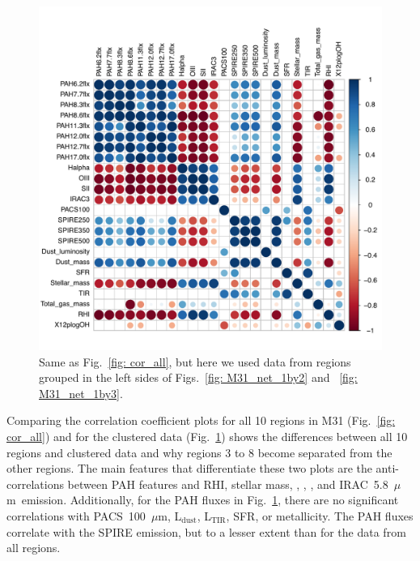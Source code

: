         \begin{figure}
        \includegraphics[width=\textwidth]{../image_paper3/images0.01/cor_plots/M31_derived_3_to_8_core_plot_for_paper.pdf}
        \caption[Pearson correlation coefficients for data from the clustered regions in M31]{Same as Fig.~\ref{fig: cor_all}, but here we used data from regions grouped in the left sides of Figs.~\ref{fig: M31_net_1by2} and ~\ref{fig: M31_net_1by3}.}
          \label{fig: cor_cluster1}
        \end{figure}
        
       
        Comparing the correlation coefficient plots for all 10 regions in M31 (Fig.~\ref{fig: cor_all}) and for the clustered data (Fig.~\ref{fig: cor_cluster1}) shows the differences between all 10 regions and clustered data and why regions 3 to 8 become separated from the other regions.
        The main features that differentiate these two plots are the anti-correlations between PAH features and RHI, stellar mass, \halphadot, \sii, \oiii, and IRAC~5.8~$\mu$m~emission.
        Additionally, for the PAH fluxes in Fig.~\ref{fig: cor_cluster1}, there are no significant correlations with PACS~100~$\mu$m, L$_\mathrm{dust}$, L$_\mathrm{TIR}$, SFR, or metallicity.
        The PAH fluxes correlate with the SPIRE emission, but to a lesser extent than for the data from all regions.
        
